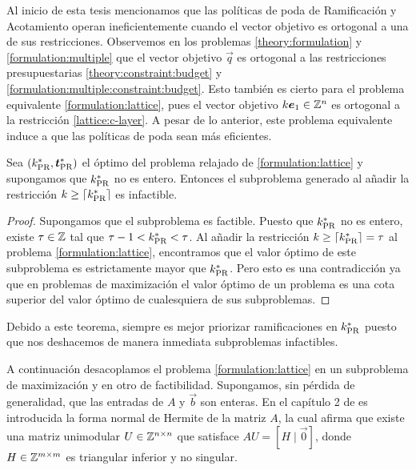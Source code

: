 Al inicio de esta tesis mencionamos que las políticas de poda de Ramificación y Acotamiento operan
ineficientemente cuando el vector objetivo es ortogonal a una de sus restricciones. Observemos
en los problemas \eqref{theory:formulation} y \eqref{formulation:multiple} que el vector objetivo
$\vec{q}$ es ortogonal a las restricciones presupuestarias \eqref{theory:constraint:budget} y
\eqref{formulation:multiple:constraint:budget}. Esto también es cierto para el problema
equivalente \eqref{formulation:lattice}, pues el vector objetivo $k\boldsymbol{e}_1 \in \mathbb{Z}^n$ es ortogonal
a la restricción \eqref{lattice:c-layer}. A pesar de lo anterior, este problema equivalente induce a
que las políticas de poda sean más eficientes.
\begin{theorem}
	\label{th:bbspeed}
	Sea $(k^*_{\text{PR}}, \boldsymbol{t}^*_{\text{PR}})$ el óptimo del problema relajado de \eqref{formulation:lattice}
	y supongamos que $k^*_{\text{PR}}$ no es entero. Entonces el subproblema generado al añadir la
	restricción $k \geq \left\lceil k^*_{\text{PR}} \right\rceil$ es infactible.
\end{theorem}
\begin{proof}
	Supongamos que el subproblema es factible. Puesto que $k^*_{\text{PR}}$ no es entero, existe $\tau \in
	\mathbb{Z}$ tal que $\tau - 1 < k^*_{\text{PR}} < \tau$. Al añadir la restricción $k \geq \left\lceil k^*_{\text{PR}} \right\rceil =
	\tau$ al problema \eqref{formulation:lattice}, encontramos que el valor óptimo de este
	subproblema es estrictamente mayor que $k^*_{\text{PR}}$. Pero esto es una contradicción ya que en
	problemas de maximización el valor óptimo de un problema es una cota superior del valor óptimo
	de cualesquiera de sus subproblemas.
\end{proof}
Debido a este teorema, siempre es mejor priorizar ramificaciones en $k^*_{\text{PR}}$ puesto que nos
deshacemos de manera inmediata subproblemas infactibles.

A continuación desacoplamos el problema \eqref{formulation:lattice} en un subproblema de
maximización y en otro de factibilidad. Supongamos, sin pérdida de generalidad, que las entradas de
$A$ y $\vec{b}$ son enteras. En el capítulo 2 de \cite{morris} es introducida la forma normal de
Hermite de la matriz $A$, la cual afirma que existe una matriz unimodular $U \in \mathbb{Z}^{n \times n}$
que satisface $AU = [H \mid \vec{0}]$, donde $H \in \mathbb{Z}^{m \times m}$ es triangular inferior y no
singular.

